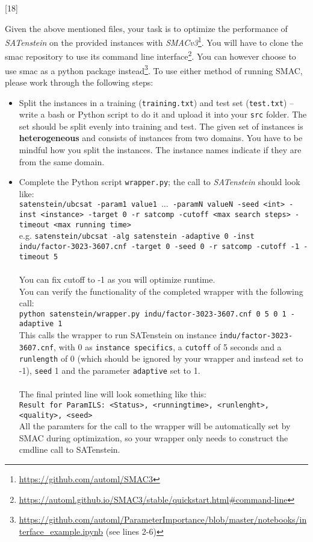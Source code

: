 \documentclass{exam}
\begin{document}
	\begin{questions}
		
		[18]
		
		Given the above mentioned files, your task is to optimize the performance of \textit{SATenstein} on the provided instances with \textit{SMACv3}\footnote{\url{https://github.com/automl/SMAC3}}. You will have to clone the smac repository to use its command line interface\footnote{\url{https://automl.github.io/SMAC3/stable/quickstart.html\#command-line}}. You can however choose to use smac as a python package instead\footnote{\url{https://github.com/automl/ParameterImportance/blob/master/notebooks/interface_example.ipynb} (see lines 2-6)}.
		To use either method of running SMAC, please work through the following steps:
		
		\begin{itemize}
			\item Split the instances in a training (\texttt{training.txt}) and test set (\texttt{test.txt}) -- write a bash or Python script to do it and upload it into your \texttt{src} folder. The set should be split evenly into training and test. The given set of instances is \textbf{heterogeneous} and consists of instances from two domains. You have to be mindful how you split the instances. The instance names indicate if they are from the same domain.
			\item Complete the Python script \texttt{wrapper.py}; the call to \textit{SATenstein} should look like:\\
			\texttt{\small satenstein/ubcsat -param1 value1 $\ldots$ -paramN valueN -seed <int> -inst <instance> -target 0 -r satcomp -cutoff <max search steps> -timeout <max running time>}\\
			e.g. \texttt{\small satenstein/ubcsat -alg satenstein -adaptive 0 -inst indu/factor-3023-3607.cnf -target 0 -seed 0 -r satcomp -cutoff -1 -timeout 5}\\
			\\
			You can fix cutoff to -1 as you will optimize runtime.\\
			You can verify the functionality of the completed wrapper with the following call:\\
			\texttt{\small python satenstein/wrapper.py indu/factor-3023-3607.cnf 0 5 0 1 -adaptive 1}\\
			This calls the wrapper to run SATenstein on instance \texttt{indu/factor-3023-3607.cnf}, with 0 as \texttt{instance specifics}, a  \texttt{cutoff} of 5 seconds and a  \texttt{runlength} of 0 (which should be ignored by your wrapper and instead set to -1),  \texttt{seed} 1 and the parameter \texttt{adaptive} set to 1.\\
			\\ The final printed line will look something like this:\\
			\texttt{\small Result for ParamILS: <Status>, <runningtime>, <runlenght>, <quality>, <seed>}
			\\
			All the paramters for the call to the wrapper will be automatically set by SMAC during optimization, so your wrapper only needs to construct the cmdline call to SATenstein.
			

\end{itemize}
\end{questions}
\end{document}
